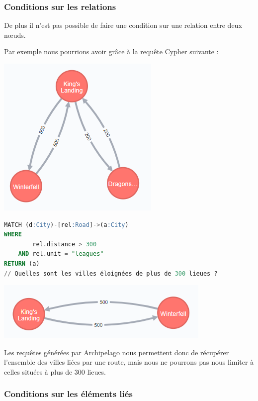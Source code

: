 \documentclass[a4paper,fleqn,12pt]{report}
\begin{document}
\subsubsection*{\bf Conditions sur les relations}
De plus il n'est  pas possible de faire une condition sur une relation entre deux nœuds. 

Par exemple nous pourrions avoir grâce à la requête Cypher suivante : 

\begin{center}
\includegraphics[scale=0.8]{figures/citiesRel.png}
\label{fig:citiesRel}
\end{center}
 
\begin{lstlisting}[language=SQL]
MATCH (d:City)-[rel:Road]->(a:City)
WHERE
	    rel.distance > 300
	AND rel.unit = "leagues"
RETURN (a)
// Quelles sont les villes éloignées de plus de 300 lieues ?
\end{lstlisting} 

\begin{center}
\includegraphics[scale=0.8]{figures/citiesRelFilt.png}
\label{fig:citiesRelFilt}
\end{center}

Les requêtes générées par Archipelago nous permettent donc de récupérer l'ensemble des villes liées par une route, mais nous ne pourrons pas nous limiter à celles situées à plus de 300 lieues.

\subsubsection*{\bf Conditions sur les éléments liés}
\end{document}
